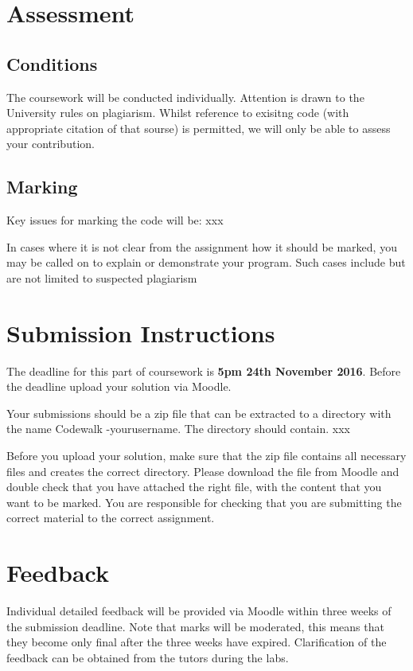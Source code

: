 \documentclass[12pt, oneside]{article}   	%
\begin{document}
\clearpage
\section{Assessment}
\subsection{Conditions}
The coursework will be conducted individually. Attention is drawn to the University rules on plagiarism. Whilst reference to exisitng code (with appropriate citation of that sourse) is permitted, we will only be able to assess your contribution.

\subsection{Marking}
Key issues for marking the code will be:
xxx

In cases where it is not clear from the assignment how it should be marked, you may be called on to explain or demonstrate your program. Such cases include but are not limited to suspected plagiarism

\section{Submission Instructions}
The deadline for this part of coursework is \textbf{5pm 24th November 2016}. Before the deadline upload your solution via Moodle.

Your submissions should be a zip file that can be extracted to a directory with the name Codewalk	-yourusername. The directory should contain.
xxx
 
Before you upload your solution, make sure that the zip file contains all necessary files and creates the correct directory. Please download the file from Moodle and double check that you have attached the right file, with the content that you want to be marked. You are responsible for checking that you are submitting the correct material to the correct assignment.

\section{Feedback}
Individual detailed feedback will be provided via Moodle within three weeks of the submission deadline. Note that marks will be moderated, this means that they become only final after the three weeks have expired. Clarification of the feedback can be obtained from the tutors during the labs.
\end{document}
